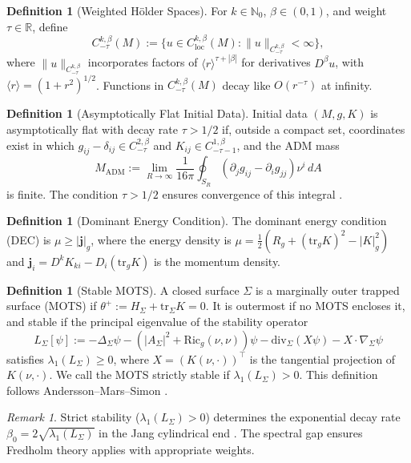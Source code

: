 \documentclass[12pt]{article}
\theoremstyle{plain}
\theoremstyle{definition}
\newtheorem{definition}[theorem]{Definition}
\theoremstyle{remark}
\newtheorem{remark}[theorem]{Remark}
\newcommand{\ADM}{\mathrm{ADM}}
\newcommand{\tr}{\mathrm{tr}}
\newcommand{\Ric}{\mathrm{Ric}}
\newcommand{\Div}{\mathrm{div}}
\newcommand{\momdens}{\boldsymbol{j}}
\newcommand{\Hoelder}{\beta}
\begin{document}
\begin{definition}[Weighted H\"older Spaces]\label{def:weighted-holder}
For $k \in \mathbb{N}_0$, $\Hoelder \in (0,1)$, and weight $\tau \in \mathbb{R}$, define
\[
C^{k,\Hoelder}_{-\tau}(M) := \{u \in C^{k,\Hoelder}_{\mathrm{loc}}(M) : \|u\|_{C^{k,\Hoelder}_{-\tau}} < \infty\},
\]
where $\|u\|_{C^{k,\Hoelder}_{-\tau}}$ incorporates factors of $\langle r \rangle^{\tau + |\beta|}$ for derivatives $D^\beta u$, with $\langle r \rangle = (1 + r^2)^{1/2}$. Functions in $C^{k,\Hoelder}_{-\tau}(M)$ decay like $O(r^{-\tau})$ at infinity.
\end{definition}

\begin{definition}[Asymptotically Flat Initial Data]\label{def:AF}
Initial data $(M, g, K)$ is asymptotically flat with decay rate $\tau > 1/2$ if, outside a compact set, coordinates exist in which $g_{ij} - \delta_{ij} \in C^{2,\Hoelder}_{-\tau}$ and $K_{ij} \in C^{1,\Hoelder}_{-\tau-1}$, and the ADM mass
\[
M_{\ADM} := \lim_{R \to \infty} \frac{1}{16\pi}\oint_{S_R}(\partial_j g_{ij} - \partial_i g_{jj})\nu^i \, dA
\]
is finite. The condition $\tau > 1/2$ ensures convergence of this integral \cite{bartnik1986}.
\end{definition}

\begin{definition}[Dominant Energy Condition]\label{def:DEC}
The dominant energy condition (DEC) is $\mu \geq |\momdens|_g$, where the energy density is $\mu = \frac{1}{2}(R_g + (\tr_g K)^2 - |K|_g^2)$ and $\momdens_i = D^k K_{ki} - D_i(\tr_g K)$ is the momentum density.
\end{definition}

\begin{definition}[Stable MOTS]\label{def:MOTS}
A closed surface $\Sigma$ is a marginally outer trapped surface (MOTS) if $\theta^+ := H_\Sigma + \tr_\Sigma K = 0$. It is outermost if no MOTS encloses it, and stable if the principal eigenvalue of the stability operator
\[
L_\Sigma[\psi] := -\Delta_\Sigma \psi - (|A_\Sigma|^2 + \Ric_g(\nu,\nu))\psi - \Div_\Sigma(X\psi) - X \cdot \nabla_\Sigma\psi
\]
satisfies $\lambda_1(L_\Sigma) \geq 0$, where $X = (K(\nu, \cdot))^\top$ is the tangential projection of $K(\nu, \cdot)$. We call the MOTS strictly stable if $\lambda_1(L_\Sigma) > 0$. This definition follows Andersson--Mars--Simon \cite{anderssonmars2008}.
\end{definition}

\begin{remark}\label{rem:mots-decay-alignment}
Strict stability ($\lambda_1(L_\Sigma) > 0$) determines the exponential decay rate $\beta_0 = 2\sqrt{\lambda_1(L_\Sigma)}$ in the Jang cylindrical end \cite{anderssonmetzger2009}. The spectral gap ensures Fredholm theory applies with appropriate weights.
\end{remark}
\end{document}
